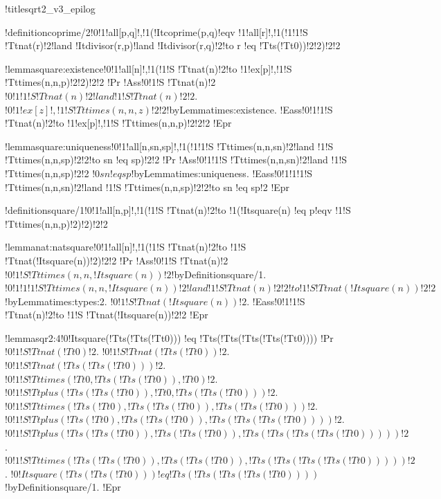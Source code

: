 
!title{sqrt2_v3_epilog}

!definition{coprime/2}{!0!1!all[p,q]!,!1(!It{coprime}(p,q)!eqv !1!all[r]!,!1(!1!1!S !Tt{nat}(r)!2!land !It{divisor}(r,p)!land !It{divisor}(r,q)!2!to r !eq !Tt{s}(!Tt{0}))!2!2)!2!2}

!lemma{square:existence}{!0!1!all[n]!,!1(!1!S !Tt{nat}(n)!2!to !1!ex[p]!,!1!S !Tt{times}(n,n,p)!2!2)!2!2}
!Pr{
!Ass{!0!1!S !Tt{nat}(n)!2}
$!0!1!1!S !Tt{nat}(n)!2!land !1!S !Tt{nat}(n)!2!2$.
$!0!1!ex[z]!,!1!S !Tt{times}(n,n,z)!2!2$!by{Lemma}{times:existence}.
!Eass{!0!1!1!S !Tt{nat}(n)!2!to !1!ex[p]!,!1!S !Tt{times}(n,n,p)!2!2!2}}
!Epr

!lemma{square:uniqueness}{!0!1!all[n,sn,sp]!,!1(!1!1!S !Tt{times}(n,n,sn)!2!land !1!S !Tt{times}(n,n,sp)!2!2!to sn !eq sp)!2!2}
!Pr{
!Ass{!0!1!1!S !Tt{times}(n,n,sn)!2!land !1!S !Tt{times}(n,n,sp)!2!2}
$!0sn !eq sp$!by{Lemma}{times:uniqueness}.
!Eass{!0!1!1!1!S !Tt{times}(n,n,sn)!2!land !1!S !Tt{times}(n,n,sp)!2!2!to sn !eq sp!2}}
!Epr

!definition{square/1}{!0!1!all[n,p]!,!1(!1!S !Tt{nat}(n)!2!to !1(!It{square}(n) !eq p!eqv !1!S !Tt{times}(n,n,p)!2)!2)!2!2}

!lemma{nat:natsquare}{!0!1!all[n]!,!1(!1!S !Tt{nat}(n)!2!to !1!S !Tt{nat}(!It{square}(n))!2)!2!2}
!Pr{
!Ass{!0!1!S !Tt{nat}(n)!2}
$!0!1!S !Tt{times}(n,n,!It{square}(n))!2$!by{Definition}{square/1}.
$!0!1!1!1!S !Tt{times}(n,n,!It{square}(n))!2!land !1!S !Tt{nat}(n)!2!2!to !1!S !Tt{nat}(!It{square}(n))!2!2$!by{Lemma}{times:types:2}.
$!0!1!S !Tt{nat}(!It{square}(n))!2$.
!Eass{!0!1!1!S !Tt{nat}(n)!2!to !1!S !Tt{nat}(!It{square}(n))!2!2}}
!Epr

!lemma{sqr2:4}{!0!It{square}(!Tt{s}(!Tt{s}(!Tt{0}))) !eq !Tt{s}(!Tt{s}(!Tt{s}(!Tt{s}(!Tt{0}))))}
!Pr{
$!0!1!S !Tt{nat}(!Tt{0})!2$.
$!0!1!S !Tt{nat}(!Tt{s}(!Tt{0}))!2$.
$!0!1!S !Tt{nat}(!Tt{s}(!Tt{s}(!Tt{0})))!2$.
$!0!1!S !Tt{times}(!Tt{0},!Tt{s}(!Tt{s}(!Tt{0})),!Tt{0})!2$.
$!0!1!S !Tt{plus}(!Tt{s}(!Tt{s}(!Tt{0})),!Tt{0},!Tt{s}(!Tt{s}(!Tt{0})))!2$.
$!0!1!S !Tt{times}(!Tt{s}(!Tt{0}),!Tt{s}(!Tt{s}(!Tt{0})),!Tt{s}(!Tt{s}(!Tt{0})))!2$.
$!0!1!S !Tt{plus}(!Tt{s}(!Tt{0}),!Tt{s}(!Tt{s}(!Tt{0})),!Tt{s}(!Tt{s}(!Tt{s}(!Tt{0}))))!2$.
$!0!1!S !Tt{plus}(!Tt{s}(!Tt{s}(!Tt{0})),!Tt{s}(!Tt{s}(!Tt{0})),!Tt{s}(!Tt{s}(!Tt{s}(!Tt{s}(!Tt{0})))))!2$.
$!0!1!S !Tt{times}(!Tt{s}(!Tt{s}(!Tt{0})),!Tt{s}(!Tt{s}(!Tt{0})),!Tt{s}(!Tt{s}(!Tt{s}(!Tt{s}(!Tt{0})))))!2$.
$!0!It{square}(!Tt{s}(!Tt{s}(!Tt{0}))) !eq !Tt{s}(!Tt{s}(!Tt{s}(!Tt{s}(!Tt{0}))))$!by{Definition}{square/1}.}
!Epr

